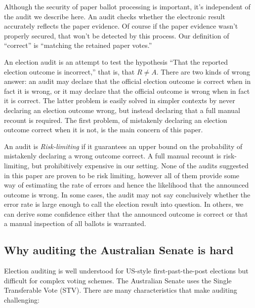 \documentclass[10pt,a4paper]{article}
\begin{document}
Although the security of paper ballot processing is important, it's independent of the audit we describe here.  An audit checks whether the electronic result accurately reflects the paper evidence.  Of course if the paper evidence wasn't properly secured, that won't be detected by this process.  Our definition of ``correct'' is ``matching the retained paper votes.''

An election audit is an attempt to test the hypothesis ``That the reported election outcome is incorrect,'' that is, that $R \neq A$.  There are two kinds of wrong answer: an audit may declare that the official election outcome is correct when in fact it is wrong, or it may declare that the official outcome is wrong when in fact it is correct.  The latter problem is easily solved in simpler contexts by never declaring an election outcome wrong, but instead declaring that a full manual recount is required.  The first problem, of mistakenly declaring an election outcome correct when it is not, is the main concern of this paper.

An audit is \emph{Risk-limiting} \cite{lindemanStark12} if it guarantees an upper bound on the probability of mistakenly declaring a wrong outcome correct.  A full manual recount is risk-limiting, but prohibitively expensive in our setting.  None of the audits suggested in this paper are proven to be risk limiting, however all of them provide some way of estimating the rate of errors and hence the likelihood that the announced outcome is wrong.  In some cases, the audit may not say conclusively whether the error rate is large enough to call the election result into question.  In others, we can derive some confidence either that the announced outcome is correct or that a manual inspection of all ballots is warranted.


\subsection{Why auditing the Australian Senate is hard}

Election auditing is well understood for US-style first-past-the-post elections but difficult for complex voting schemes.  The Australian Senate uses the Single Transferable Vote (STV).  
There are many characteristics that make auditing challenging:
\end{document}
